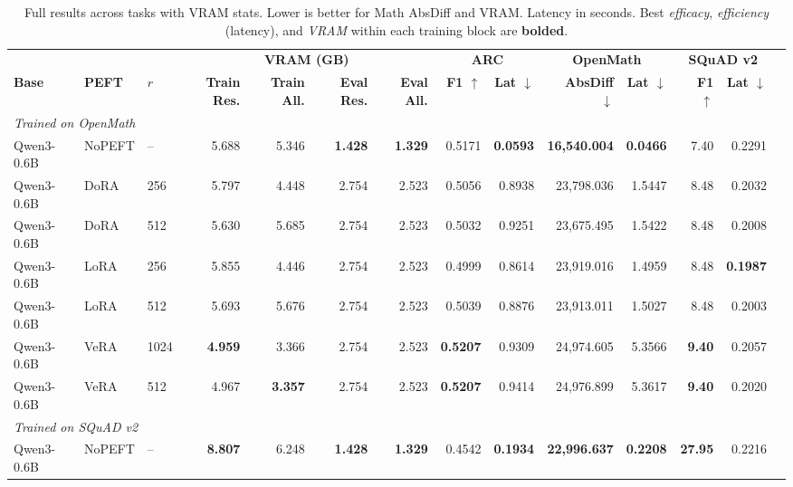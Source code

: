 \documentclass[11pt,a4paper]{article}
\begin{document}
\begin{table}[H]
\centering
\caption{Full results across tasks with VRAM stats. Lower is better for Math AbsDiff and VRAM. Latency in seconds. Best \emph{efficacy}, \emph{efficiency} (latency), and \emph{VRAM} within each training block are \textbf{bolded}.}
\label{tab:full_with_vram}
\footnotesize
\begin{adjustbox}{max width=\textwidth}
\begin{tabular}{lll rrrrr r rr r rr}
\toprule
 & & & \multicolumn{4}{c}{\textbf{VRAM (GB)}} & \multicolumn{2}{c}{\textbf{ARC}} & \multicolumn{2}{c}{\textbf{OpenMath}} & \multicolumn{2}{c}{\textbf{SQuAD v2}} \\
\cmidrule(lr){4-7}\cmidrule(lr){8-9}\cmidrule(lr){10-11}\cmidrule(lr){12-13}
\textbf{Base} & \textbf{PEFT} & \textbf{$r$} &
\textbf{Train Res.} & \textbf{Train All.} & \textbf{Eval Res.} & \textbf{Eval All.} &
\textbf{F1 $\uparrow$} & \textbf{Lat $\downarrow$} &
\textbf{AbsDiff $\downarrow$} & \textbf{Lat $\downarrow$} &
\textbf{F1 $\uparrow$} & \textbf{Lat $\downarrow$} \\
\midrule
\multicolumn{13}{l}{\textit{Trained on OpenMath}} \\
Qwen3-0.6B & NoPEFT & --   & 5.688 & 5.346 & \textbf{1.428} & \textbf{1.329} & 0.5171 & \textbf{0.0593} & \textbf{16{,}540.004} & \textbf{0.0466} & 7.40 & 0.2291 \\
Qwen3-0.6B & DoRA   & 256  & 5.797 & 4.448 & 2.754 & 2.523 & 0.5056 & 0.8938 & 23{,}798.036 & 1.5447 & 8.48 & 0.2032 \\
Qwen3-0.6B & DoRA   & 512  & 5.630 & 5.685 & 2.754 & 2.523 & 0.5032 & 0.9251 & 23{,}675.495 & 1.5422 & 8.48 & 0.2008 \\
Qwen3-0.6B & LoRA   & 256  & 5.855 & 4.446 & 2.754 & 2.523 & 0.4999 & 0.8614 & 23{,}919.016 & 1.4959 & 8.48 & \textbf{0.1987} \\
Qwen3-0.6B & LoRA   & 512  & 5.693 & 5.676 & 2.754 & 2.523 & 0.5039 & 0.8876 & 23{,}913.011 & 1.5027 & 8.48 & 0.2003 \\
Qwen3-0.6B & VeRA   & 1024 & \textbf{4.959} & 3.366 & 2.754 & 2.523 & \textbf{0.5207} & 0.9309 & 24{,}974.605 & 5.3566 & \textbf{9.40} & 0.2057 \\
Qwen3-0.6B & VeRA   & 512  & 4.967 & \textbf{3.357} & 2.754 & 2.523 & \textbf{0.5207} & 0.9414 & 24{,}976.899 & 5.3617 & \textbf{9.40} & 0.2020 \\
\midrule
\multicolumn{13}{l}{\textit{Trained on SQuAD v2}} \\
Qwen3-0.6B & NoPEFT & --   & \textbf{8.807} & 6.248 & \textbf{1.428} & \textbf{1.329} & 0.4542 & \textbf{0.1934} & \textbf{22{,}996.637} & \textbf{0.2208} & \textbf{27.95} & 0.2216 \\

\end{tabular}
\end{adjustbox}
\end{table}
\end{document}
